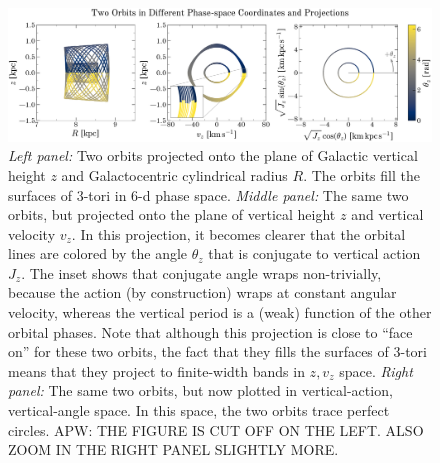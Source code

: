 \documentclass[modern]{aastex63}
\begin{document}
\begin{figure}[!tp]
  \begin{center}
  \includegraphics[width=\textwidth]{zvz-orbit-demo.pdf}
  \end{center}
  \caption{%
    \textsl{Left panel:} Two orbits projected onto the plane of
    Galactic vertical height $z$ and Galactocentric cylindrical radius
    $R$. The orbits fill the surfaces of 3-tori in 6-d phase space.
    \textsl{Middle panel:} The same two orbits, but projected onto the plane
    of vertical height $z$ and vertical velocity $v_z$. In this projection,
    it becomes clearer that the orbital lines are
    colored by the angle $\theta_z$ that is conjugate to vertical action $J_z$.
    The inset shows that conjugate angle wraps non-trivially, because the action
    (by construction) wraps at constant angular velocity, whereas the vertical period
    is a (weak) function of the other orbital phases.
    Note that although this projection is close to ``face on'' for these two
    orbits, the fact that they fills the surfaces of 3-tori means that they
    project to finite-width bands in $z, v_z$ space.
    \textsl{Right panel:} The same two orbits, but now plotted in vertical-action,
    vertical-angle space. In this space, the two orbits trace perfect circles.
    APW: THE FIGURE IS CUT OFF ON THE LEFT. ALSO ZOOM IN THE RIGHT PANEL SLIGHTLY MORE.
  \label{fig:zvz-demo}
  }
\end{figure}
\end{document}
